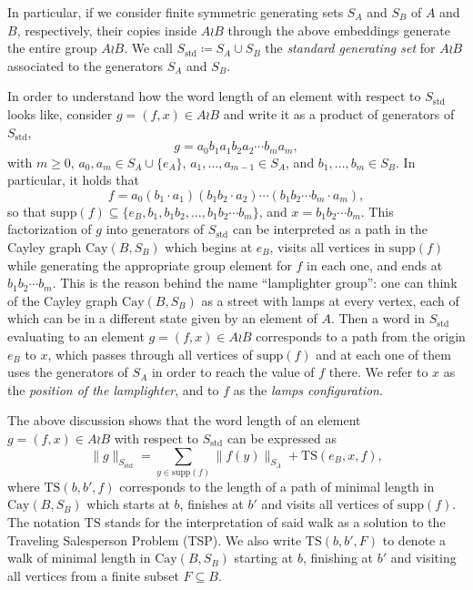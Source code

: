 \documentclass[reqno,oneside]{amsart}
\newcommand{\cay}[2]{\mathrm{Cay}(#1,#2)}
\newcommand{\supp}[1]{\mathrm{supp}(#1)}
\newcommand{\std}{S_{\mathrm{std}}}
\newcommand{\TS}[3]{\mathrm{TS}\left(#1,#2,#3\right)}
\theoremstyle{plain}
\theoremstyle{definition}
\begin{document}
In particular, if we consider finite symmetric generating sets $S_A$ and $S_B$ of $A$ and $B$, respectively, their copies inside $A\wr B$ through the above embeddings generate the entire group $A\wr B$. We call $S_{\mathrm{std}}\coloneqq S_A\cup S_B$ the \textit{standard generating set} for $A\wr B$ associated to the generators $S_A$ and $S_B$. 

In order to understand how the word length of an element with respect to $\std$ looks like, consider $g=(f,x)\in A\wr B$ and write it as a product of generators of $\std$,
$$
g=a_0b_1a_1b_2a_2\cdots b_ma_m,
$$
with $m\ge 0$, $a_0,a_m\in S_A\cup\{ e_A \}$, $a_1,\ldots,a_{m-1}\in S_A$, and $b_1,\ldots,b_m\in S_B$. In particular, it holds that $$f=a_0(b_1\cdot a_1)(b_1b_2\cdot a_2)\cdots (b_1b_2\cdots b_m \cdot a_m),$$ 
so that $\supp{f}\subseteq \{e_B,b_1,b_1b_2,\ldots,b_1b_2\cdots b_m\}$, and $x=b_1b_2\cdots b_m$. This factorization of $g$ into generators of $\std$ can be interpreted as a path in the Cayley graph $\cay{B}{S_B}$ which begins at $e_B$, visits all vertices in $\supp{f}$ while generating the appropriate group element for $f$ in each one, and ends at $b_1b_2\cdots b_m$. This is the reason behind the name ``lamplighter group'': one can think of the Cayley graph $\cay{B}{S_B}$ as a street with lamps at every vertex, each of which can be in a different state given by an element of $A$. Then a word in $\std$ evaluating to an element $g=(f,x)\in A\wr B$ corresponds to a path from the origin $e_B$ to $x$, which passes through all vertices of $\supp{f}$ and at each one of them uses the generators of $S_A$ in order to reach the value of $f$ there. We refer to $x$ as the \textit{position of the lamplighter}, and to $f$ as the \textit{lamps configuration}.

The above discussion shows that the word length of an element $g=(f,x)\in A\wr B$ with respect to $\std$ can be expressed as
\begin{equation}\label{eq: express word length of wreath product}
\|g\|_{\std}=   \sum_{y\in \supp{f}}\|f(y)\|_{S_A}+\TS{e_B}{x}{f},
\end{equation}
where $\TS{b}{b'}{f}$ corresponds to the length of a path of minimal length in $\cay{B}{S_B}$ which starts at $b$, finishes at $b'$ and visits all vertices of $\supp{f}$. The notation $\mathrm{TS}$ stands for the interpretation of said walk as a solution to the Traveling Salesperson Problem (TSP). We also write $\TS{b}{b'}{F}$ to denote a walk of minimal length in $\cay{B}{S_B}$ starting at $b$, finishing at $b'$ and visiting all vertices from a finite subset $F\subseteq B$.
\end{document}
